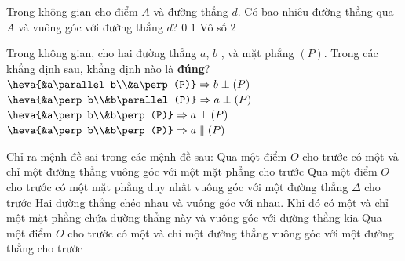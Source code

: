 \begin{ex}%
	Trong không gian cho điểm  $A$ và đường thẳng $d$. Có bao nhiêu đường thẳng qua $A$ và vuông góc với đường thẳng $d$?
	\choice 
		 {$0$}
		 {$1$}
		{\True  Vô số}
		{$2$} 
\end{ex}

\begin{ex}%
	Trong không gian, cho  hai đường thẳng $a$, $b$ , và mặt phẳng $(P)$. Trong các khẳng định sau,
	 khẳng định nào là \textbf{đúng}?
	 \choice
		 {\True $\heva{&a\parallel b\\&a\perp(P)}\Rightarrow b\perp(P)$}
		 {$\heva{&a\perp b\\&b\parallel(P)}\Rightarrow a\perp(P)$}
		 {$\heva{&a\perp b\\&b\perp(P)}\Rightarrow a\perp(P)$}
		{$\heva{&a\perp  b\\&b\perp(P)}\Rightarrow a\parallel(P)$}
	 \loigiai{
	 }
\end{ex}

\begin{ex}%
	Chỉ ra mệnh đề sai trong các mệnh đề  sau:
	\choice 
		{Qua một điểm  $O$ cho trước có một và chỉ một đường thẳng vuông góc với một mặt phẳng cho trước}
		{Qua một điểm $O$ cho trước có một mặt phẳng duy nhất vuông góc với một đường thẳng $\Delta$ cho  trước}
		{Hai đường thẳng chéo nhau và vuông góc với nhau. Khi đó có một và chỉ một mặt phẳng chứa đường thẳng này và vuông góc với  đường thẳng kia}
		{\True Qua một điểm $O$ cho trước có một và chỉ một đường thẳng vuông góc với một đường thẳng  cho trước}
\end{ex}

